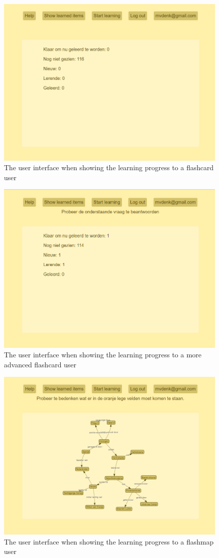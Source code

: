 \begin{figure}
    \centering
    \includegraphics[width=.8\textwidth]{img/ui_fc_learnprogress_1.png}
    \caption{The user interface when showing the learning progress to a flashcard user}
    \label{fig:ui_fc_learnprogress_1}
\end{figure}

\begin{figure}
    \centering
    \includegraphics[width=.8\textwidth]{img/ui_fc_learnprogress_2.png}
    \caption{The user interface when showing the learning progress to a more advanced flashcard user}
    \label{fig:ui_fc_learnprogress_2}
\end{figure}

\begin{figure}
    \centering
    \includegraphics[width=.8\textwidth]{img/ui_fm_learnprogress.png}
    \caption{The user interface when showing the learning progress to a flashmap user}
    \label{fig:ui_fm_learnprogress}
\end{figure}


